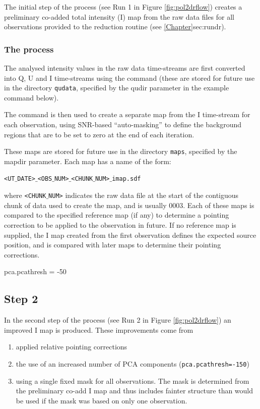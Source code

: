 The initial step of the process (see Run 1 in Figure
\ref{fig:pol2drflow}) creates a preliminary co-added total intensity
(I) map from the raw data files for all observations provided to the
reduction routine (see \cref{Chapter}{sec:rundr}{}).


\subsubsection*{The process}
The analysed intensity values in the raw data time-streams are first
converted into Q, U and I time-streams using the
 command (these are stored
for future use in the directory \texttt{qudata}, specified by the
qudir parameter in the example command below).

The  command is then used to
create a separate map from the I time-stream for each observation,
using SNR-based ``auto-masking'' to define the background regions that
are to be set to zero at the end of each iteration.

These maps are stored for future use in the directory \texttt{maps},
specified by the mapdir parameter. Each map has a name of the form:

\texttt{<UT$\_$DATE>$\_$<OBS$\_$NUM>$\_$<CHUNK$\_$NUM>$\_$imap.sdf}

where \texttt{<CHUNK$\_$NUM>} indicates the raw data file at the start
of the contiguous chunk of data used to create the map, and is usually
0003.  Each of these maps is compared to the specified reference map
(if any) to determine a pointing correction to be applied to the
observation in future. If no reference map is supplied, the I map
created from the first observation defines the expected source
position, and is compared with later maps to determine their pointing
corrections.

pca.pcathresh = -50



\subsection*{Step 2}

In the second step of the process (see Run 2 in Figure
\ref{fig:pol2drflow}) an improved I map is produced. These
improvements come from
\begin{enumerate}
\item applied relative pointing corrections
\item the use of an increased number of PCA components
  (\texttt{pca.pcathresh=-150})
\item using a single fixed mask for all observations. The mask is
  determined from the preliminary co-add I map and thus includes
  fainter structure than would be used if the mask was based on only
  one observation.
\end{enumerate}

